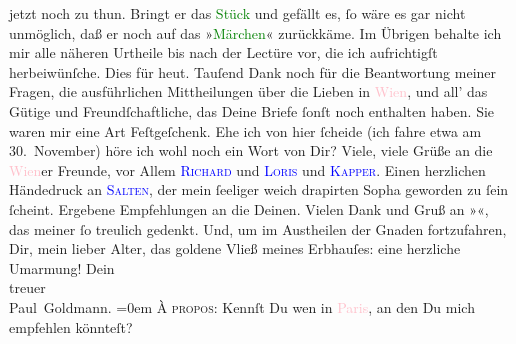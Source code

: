                jetzt noch zu thun. Bringt er das \textcolor{green}{Stück}{} und gefällt es, ſo wäre es gar nicht unmöglich, daß er noch auf das
                  »\textcolor{green}{Märchen}{}\ledrightnote{\textcolor{green}{Das Märchen. Schauspiel in drei Aufzügen}}« zurückkäme. Im Übrigen behalte ich
               mir alle näheren Urtheile bis nach der Lectüre vor, die ich aufrichtigſt
               herbeiwünſche.\pend
           \pstart
           Dies für heut. Tauſend Dank noch für die Beantwortung
               meiner Fragen, die ausführlichen Mittheilungen über die Lieben in \textcolor{pink}{Wien}{}\ledrightnote{\textcolor{pink}{Wien}}, und all’ das Gütige und Freundſchaftliche, das Deine {\pb}Briefe ſonſt noch enthalten haben. Sie waren mir
               eine Art Feſtgeſchenk. Ehe ich von hier ſcheide (ich fahre etwa am 30. November) höre ich wohl noch ein Wort von Dir? Viele,
               viele Grüße an die \textcolor{pink}{Wien}{}\ledrightnote{\textcolor{pink}{Wien}}er Freunde, vor Allem \textsc{\textcolor{blue}{Richard}{}\ledrightnote{\textcolor{blue}{Richard Beer-Hofmann}}} und \textsc{\textcolor{blue}{Loris}{}\ledrightnote{\textcolor{blue}{Hugo von Hofmannsthal}}} und \textsc{\textcolor{blue}{Kapper}{}\ledrightnote{\textcolor{blue}{Friedrich Kapper}}}. Einen herzlichen Händedruck an \textsc{\textcolor{blue}{Salten}{}\ledrightnote{\textcolor{blue}{Felix Salten}}}, der mein ſeeliger \label{K_L02670-555v}\label{K_L02670-555h} weich drapirten
               Sopha geworden zu ſein ſcheint. Ergebene Empfehlungen an die Deinen. Vielen Dank und
               Gruß an »\label{K_L02670-77v}\label{K_L02670-77h}«, das meiner ſo treulich gedenkt. Und, um im Austheilen der Gnaden
               fortzufahren, Dir, mein lieber Alter, das goldene Vließ meines Erbhauſes: eine
               herzliche Umarmung!\pend
           \pstart
           Dein {\\[\baselineskip]}treuer {\\[\baselineskip]}\spacefill\mbox{Paul Goldmann.}\pend
           \leftskip=0em{}\pstart
           \noindent{}\textsc{À propos}: Kennſt Du wen in \textcolor{pink}{Paris}{}\ledrightnote{\textcolor{pink}{Paris}}, an den Du mich empfehlen könnteſt?\pend
           \endnumbering{}  
      